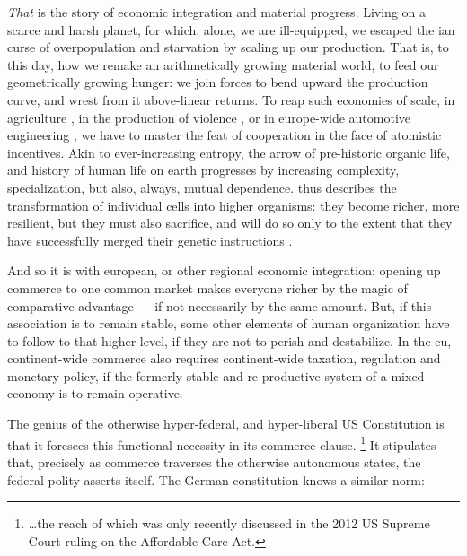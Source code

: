 \emph{That} is the story of economic integration and material progress.
Living on a scarce and harsh planet, for which, alone, we are ill-equipped, we escaped the \citeauthor{Malthus1798}ian curse of overpopulation and starvation by scaling up our production.
That is, to this day, how we remake an arithmetically growing material world, to feed our geometrically growing hunger:
we join forces to bend upward the production curve, and wrest from it above-linear returns.
To reap such economies of scale, in agriculture \citep{Diamond1997}, in the production of violence \citep{Tilly-1985-aa}, or in europe-wide automotive engineering \citep{Krugman-1980-aa}, we have to master the feat of cooperation in the face of atomistic incentives.
Akin to ever-increasing entropy, the arrow of pre-historic organic life, and history of human life on earth progresses by increasing complexity, specialization, but also, always, mutual dependence.
\citeauthor{Wright1994} thus describes the transformation of individual cells into higher organisms:
they become richer, more resilient, but they must also sacrifice, and will do so only to the extent that they have successfully merged their genetic instructions \citeyearpar[Chapters 7, 8]{Wright1994}.

And so it is with european, or other regional economic integration:
opening up commerce to one common market makes everyone richer by the magic of comparative advantage --- if not necessarily by the same amount.
But, if this association is to remain stable, some other elements of human organization have to follow to that higher level, if they are not to perish and destabilize.
In the \gls{eu}, continent-wide commerce also requires continent-wide taxation, regulation and monetary policy, if the formerly stable and re-productive system of a mixed economy is to remain operative.

The genius of the otherwise hyper-federal, and hyper-liberal US Constitution is that it foresees this functional necessity in its commerce clause.
\footnote{
	\ldots the reach of which was only recently discussed in the 2012 US Supreme Court ruling on the Affordable Care Act.
}
It stipulates that, precisely as commerce traverses the otherwise autonomous states, the federal polity asserts itself.
The German constitution knows a similar norm:

